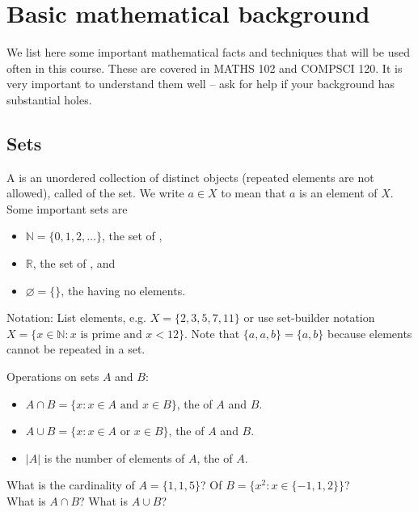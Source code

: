 \chapter{Basic mathematical background}
\label{ch:app:mathtools}

We list here some important mathematical facts and techniques  that will be used often in this course.
These are covered in MATHS 102 and COMPSCI 120.
It is very important to understand them well -- ask for help if your background has substantial holes.

\section{Sets}
A  is an unordered collection of distinct objects (repeated elements are not allowed), called  of the set. 
We write $a \in X$ to mean that $a$ is an element of $X$. Some important sets are 
\begin{itemize}
\item $\mathbb{N} = \{0, 1, 2, \dots\}$, the set of ,
\item $\mathbb{R}$, the set of , and
\item $\varnothing = \{\}$, the  having no elements.
\end{itemize}

Notation: List elements, e.g. $X = \{2,3,5,7,11\}$ or use set-builder notation $X = \{x \in \mathbb{N} : x \text{ is prime and } x < 12\}$. 
Note that $\{a, a, b\} = \{a, b\}$ because elements cannot be repeated in a set.

Operations on sets $A$ and $B$: 
\begin{itemize}
\item $A\cap B = \{x: x \in A \text{ and } x \in B\}$, the  of $A$ and $B$.
\item $A\cup B = \{x: x \in A \text{ or  } x \in B\}$, the  of $A$ and $B$.
\item $|A|$ is the number of elements of $A$, the  of $A$.
\end{itemize}

\begin{Boxample}[2.5]
What is the cardinality of $A = \{1,1,5\}$? Of $B = \{x^2 : x \in \{-1,1,2\}\}$?\\

\vspace{2cm}
What is $A \cap B$? What is $A \cup B$?
\end{Boxample}


